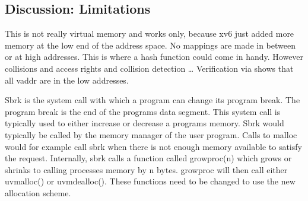 \subsection{Discussion: Limitations}
This is not really virtual memory and works only, because xv6 just added more memory at the low
end of the address space. No mappings are made in between or at high addresses.
This is where a hash function could come in handy. However collisions and access rights and
collision detection \ldots
Verification via %
shows that all vaddr are in the low addresses.

Sbrk is the system call with which a program can change its program break. The program break
is the end of the programs data segment. This system call is typically used to either
increase or decrease a programs memory.
Sbrk would typically be called by the memory manager of the user program. Calls
to malloc would for example call sbrk when there is not enough memory available to
satisfy the request.
Internally, sbrk calls a function called growproc(n) which grows or shrinks to calling
processes memory by n bytes.
growproc will then call either uvmalloc() or uvmdealloc(). These functions need to be
changed to use the new allocation scheme.





